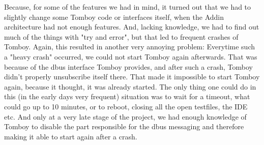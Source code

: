 Because, for some of the features we had in mind, it turned out that we had to slightly change some Tomboy code or interfaces itself, when the Addin architecture had not enough features. And, lacking knowledge, we had to find out much of the things with "try and error", but that led to frequent crashes of Tomboy. Again, this resulted in another very annoying problem: Everytime such a "heavy crash" occurred, we could not start Tomboy again afterwards. That was because of the dbus interface Tomboy provides, and after such a crash, Tomboy didn't properly unsubscribe itself there. That made it impossible to start Tomboy again, because it thought, it was already started. The only thing one could do in this (in the early days very frequent) situation was to wait for a timeout, what could go up to 10 minutes, or to reboot, closing all the open testfiles, the IDE etc. And only at a very late stage of the project, we had enough knowledge of Tomboy to disable the part responsible for the dbus messaging and therefore making it able to start again after a crash.